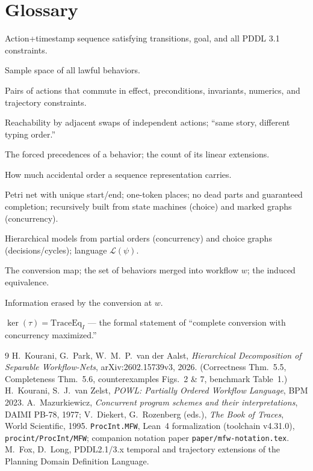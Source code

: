 \documentclass[11pt]{article}
\theoremstyle{definition}
\theoremstyle{plain}
\theoremstyle{remark}
\begin{document}
\section*{Glossary}
\begin{description}[nosep]
  \item[Lawful behavior] Action+timestamp sequence satisfying transitions,
  goal, and all PDDL 3.1 constraints.
  \item[$\mathcal{P}(\Pi)$] Sample space of all lawful behaviors.
  \item[Independence $I$] Pairs of actions that commute in effect,
  preconditions, invariants, numerics, and trajectory constraints.
  \item[Trace equivalence $\sim_I$] Reachability by adjacent swaps of
  independent actions; ``same story, different typing order.''
  \item[Causal order $P_b$; $e(P)$] The forced precedences of a behavior;
  the count of its linear extensions.
  \item[Serialization entropy $H_{\mathrm{ser}} = \log e(P)$] How much
  accidental order a sequence representation carries.
  \item[WF-net; safe; sound; separable] Petri net with unique start/end;
  one-token places; no dead parts and guaranteed completion; recursively
  built from state machines (choice) and marked graphs (concurrency).
  \item[POWL v2] Hierarchical models from partial orders (concurrency) and
  choice graphs (decisions/cycles); language $\mathcal{L}(\psi)$.
  \item[$\tau$; fiber $F_w$; kernel] The conversion map; the set of
  behaviors merged into workflow $w$; the induced equivalence.
  \item[Fiber entropy $S_\tau(w) = \log|F_w|$] Information erased by the
  conversion at $w$.
  \item[Crown theorem] $\ker(\tau) = \mathrm{TraceEq}_I$ --- the formal
  statement of ``complete conversion with concurrency maximized.''
\end{description}

\begin{thebibliography}{9}
 H.~Kourani, G.~Park, W.~M.~P.~van der Aalst,
\emph{Hierarchical Decomposition of Separable Workflow-Nets},
arXiv:2602.15739v3, 2026. (Correctness Thm.~5.5, Completeness Thm.~5.6,
counterexamples Figs.~2 \& 7, benchmark Table~1.)
 H.~Kourani, S.~J.~van Zelst, \emph{POWL: Partially Ordered
Workflow Language}, BPM 2023.
 A.~Mazurkiewicz, \emph{Concurrent program schemes and
their interpretations}, DAIMI PB-78, 1977; V.~Diekert, G.~Rozenberg (eds.),
\emph{The Book of Traces}, World Scientific, 1995.
 \texttt{ProcInt.MFW}, Lean~4 formalization (toolchain
v4.31.0), \texttt{procint/ProcInt/MFW}; companion notation paper
\texttt{paper/mfw-notation.tex}.
 M.~Fox, D.~Long, PDDL2.1/3.x temporal and trajectory
extensions of the Planning Domain Definition Language.
\end{thebibliography}
\end{document}
